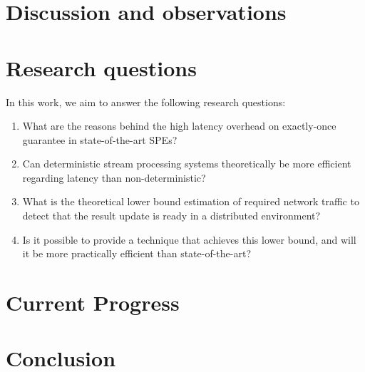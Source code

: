 \documentclass[runningheads]{llncs}
\begin{document}
\section {Discussion and observations}

\section {Research questions}

In this work, we aim to answer the following research questions:
\begin{enumerate}
    \item What are the reasons behind the high latency overhead on exactly-once guarantee in state-of-the-art SPEs?
    \item Can deterministic stream processing systems theoretically be more efficient regarding latency than non-deterministic? 
    \item What is the theoretical lower bound estimation of required network traffic to detect that the result update is ready in a distributed environment? 
    \item Is it possible to provide a technique that achieves this lower bound, and will it be more practically efficient than state-of-the-art? 
\end{enumerate}

\section {Current Progress}

\section {Conclusion}




\end{document}
